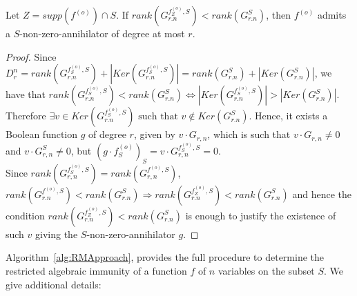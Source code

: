 \documentclass[11pt]{llncs}
\begin{document}
\begin{proposition}\label{prop:compareranks}
	Let $Z = supp\left(f^{(o)}\right) \cap S$.
	If $rank\left(G^{f_{Z}^{(o)},S}_{r.n}\right) < rank(G^{S}_{r.n})$, then $f^{(o)}$ admits a $S$-non-zero-annihilator of degree at most $r$.
\end{proposition}
\begin{proof}
	Since $D_r^n = rank(G^{f^{(o)}_S,S}_{r.n}) + |Ker(G^{f^{(o)}_S,S}_{r.n})| =  rank(G^{S}_{r.n}) + |Ker(G^{S}_{r.n})|$, we have that
	$rank(G^{f_S^{(o)},S}_{r.n}) < rank(G^{S}_{r.n}) \iff |Ker(G^{f_S^{(o)},S}_{r.n})| > |Ker(G^{S}_{r.n})|$. Therefore $\exists v\in Ker(G^{f_S^{(o)},S}_{r.n}) \mbox{ such that }v\not\in Ker(G^{S}_{r.n})$. Hence, it exists a Boolean function $g$ of degree $r$, given by $v \cdot G_{r,n}$, which is such that $v \cdot G_{r,n}\neq 0$ and $v \cdot G_{r,n}^{S}\neq 0$, but $(g \cdot f_S^{(o)})_S = v \cdot G_{r,n}^{f_S^{(o)},S} = 0$.\\
	Since $rank\left(G_{r,n}^{f_S^{(o)}, S}\right) = rank\left(G_{r,n}^{f^{(o)}, S}\right)$, $rank(G^{f^{(o)},S}_{r.n}) < rank(G^{S}_{r.n}) \Rightarrow rank(G^{f_Z^{(o)},S}_{r.n}) < rank(G^{S}_{r.n})$ and hence the condition $rank(G^{f_Z^{(o)},S}_{r.n}) < rank(G^{S}_{r.n})$ is enough to justify the existence of such $v$ giving the $S$-non-zero-annihilator $g$.
\end{proof}

Algorithm~\ref{alg:RMApproach}, provides the full procedure to determine the restricted algebraic immunity of a function $f$ of $n$ variables on the subset $S$. We give additional details:
\end{document}
